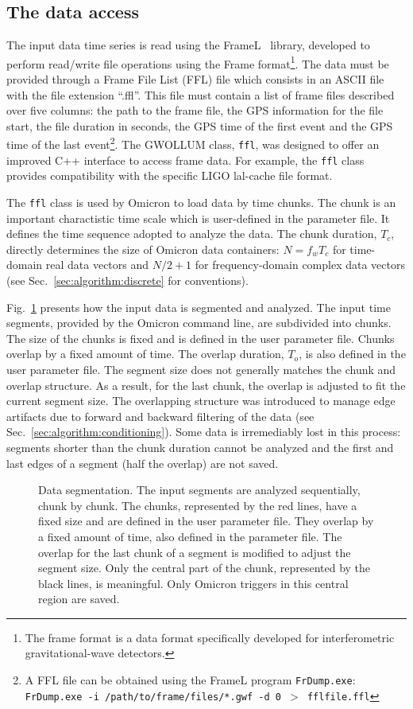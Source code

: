 \subsection{The data access} \label{sec:algorithm:data}
The input data time series is read using the FrameL~\cite{FrameL} library, developed to perform read/write file operations using the Frame format\footnote{The frame format is a data format specifically developed for interferometric gravitational-wave detectors.}. The data must be provided through a Frame File List (FFL) file which consists in an ASCII file with the file extension ``.ffl''. This file must contain a list of frame files described over five columns: the path to the frame file, the GPS information for the file start, the file duration in seconds, the GPS time of the first event and the GPS time of the last event\footnote{A FFL file can be obtained using the FrameL program \texttt{FrDump.exe}: \texttt{FrDump.exe -i /path/to/frame/files/*.gwf -d 0 $>$ fflfile.ffl}}. The GWOLLUM class, \texttt{ffl}, was designed to offer an improved C++ interface to access frame data. For example, the \texttt{ffl} class provides compatibility with the specific LIGO lal-cache file format.

The \texttt{ffl} class is used by Omicron to load data by time chunks. The chunk is an important charactistic time scale which is user-defined in the parameter file. It defines the time sequence adopted to analyze the data. The chunk duration, $T_c$, directly determines the size of Omicron data containers: $N=f_wT_c$ for time-domain real data vectors and $N/2+1$ for frequency-domain complex data vectors (see Sec.~\ref{sec:algorithm:discrete} for conventions).

Fig.~\ref{fig:segmentation} presents how the input data is segmented and analyzed. The input time segments, provided by the Omicron command line, are subdivided into chunks. The size of the chunks is fixed and is defined in the user parameter file. Chunks overlap by a fixed amount of time. The overlap duration, $T_o$, is also defined in the user parameter file. The segment size does not generally matches the chunk and overlap structure. As a result, for the last chunk, the overlap is adjusted to fit the current segment size. The overlapping structure was introduced to manage edge artifacts due to forward and backward filtering of the data (see Sec.~\ref{sec:algorithm:conditioning}). Some data is irremediably lost in this process: segments shorter than the chunk duration cannot be analyzed and the first and last edges of a segment (half the overlap) are not saved.
\begin{figure}
  \center
  \caption{Data segmentation. The input segments are analyzed sequentially, chunk by chunk. The chunks, represented by the red lines, have a fixed size and are defined in the user parameter file. They overlap by a fixed amount of time, also defined in the parameter file. The overlap for the last chunk of a segment is modified to adjust the segment size. Only the central part of the chunk, represented by the black lines, is meaningful. Only Omicron triggers in this central region are saved.}
  \label{fig:segmentation}
\end{figure}

